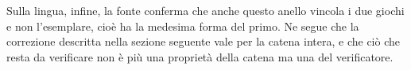 Sulla lingua, infine, la fonte conferma che anche questo anello vincola i due giochi e non l'esemplare, cioè ha la medesima forma del primo. Ne segue che la correzione descritta nella sezione seguente vale per la catena intera, e che ciò che resta da verificare non è più una proprietà della catena ma una del verificatore.
